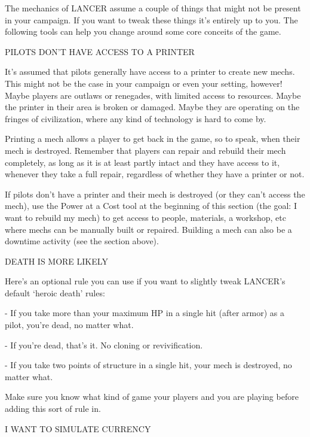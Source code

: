 The mechanics of LANCER assume a couple of things that might not be present in your
campaign. If you want to tweak these things it’s entirely up to you. The following tools can help
you change around some core conceits of the game.


                           PILOTS DON’T HAVE ACCESS TO A PRINTER


It’s assumed that pilots generally have access to a printer to create new mechs. This might not
be the case in your campaign or even your setting, however! Maybe players are outlaws or
renegades, with limited access to resources. Maybe the printer in their area is broken or
damaged. Maybe they are operating on the fringes of civilization, where any kind of technology is
hard to come by.





Printing a mech allows a player to get back in the game, so to speak, when their mech is
destroyed. Remember that players can repair and rebuild their mech completely, as long as it is
at least partly intact and they have access to it, whenever they take a full repair, regardless of
whether they have a printer or not.


If pilots don’t have a printer and their mech is destroyed (or they can’t access the mech), use the
Power at a Cost tool at the beginning of this section (the goal: I want to rebuild my mech) to get
access to people, materials, a workshop, etc where mechs can be manually built or repaired.
Building a mech can also be a downtime activity (see the section above).


                                          DEATH IS MORE LIKELY


Here’s an optional rule you can use if you want to slightly tweak LANCER’s default ‘heroic death’
rules:

             -    If you take more than your maximum HP in a single hit (after armor) as a pilot,
                 you’re dead, no matter what.

             -    If you’re dead, that’s it. No cloning or revivification.

             -    If you take two points of structure in a single hit, your mech is destroyed, no
                  matter what.

Make sure you know what kind of game your players and you are playing before adding this sort
of rule in.


                                    I WANT TO SIMULATE CURRENCY

